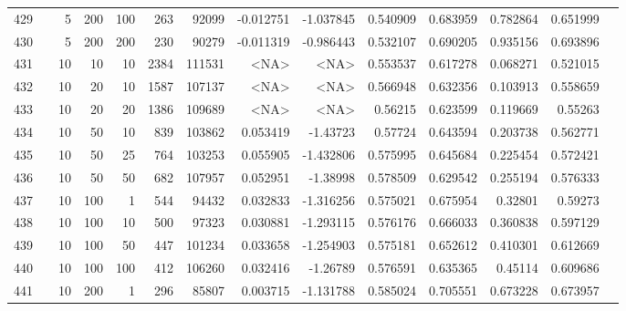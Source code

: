 \begin{longtable}{llrrrrrrrrrrrr}
		429 & &            5 &               200 &          100 &          263 &      92099 & -0.012751 & -1.037845 &  0.540909 &    0.683959 &       0.782864 &  0.651999 \\
		430 & &            5 &               200 &          200 &          230 &      90279 & -0.011319 & -0.986443 &  0.532107 &    0.690205 &       0.935156 &  0.693896 \\
		431 & &           10 &                10 &           10 &           2384 &     111531 &      <NA> &      <NA> &  0.553537 &    0.617278 &       0.068271 &  0.521015 \\
		432 & &           10 &                20 &           10 &           1587 &     107137 &      <NA> &      <NA> &  0.566948 &    0.632356 &       0.103913 &  0.558659 \\
		433 & &           10 &                20 &           20 &           1386 &     109689 &      <NA> &      <NA> &   0.56215 &    0.623599 &       0.119669 &   0.55263 \\
		434 & &           10 &                50 &           10 &         839 &     103862 &  0.053419 &  -1.43723 &   0.57724 &    0.643594 &       0.203738 &  0.562771 \\
		435 & &           10 &                50 &           25 &          764 &     103253 &  0.055905 & -1.432806 &  0.575995 &    0.645684 &       0.225454 &  0.572421 \\
		436 & &           10 &                50 &           50 &          682 &     107957 &  0.052951 &  -1.38998 &  0.578509 &    0.629542 &       0.255194 &  0.576333 \\
		437 & &           10 &               100 &            1 &          544 &      94432 &  0.032833 & -1.316256 &  0.575021 &    0.675954 &        0.32801 &   0.59273 \\
		438 & &           10 &               100 &           10 &          500 &      97323 &  0.030881 & -1.293115 &  0.576176 &    0.666033 &       0.360838 &  0.597129 \\
		439 & &           10 &               100 &           50 &          447 &     101234 &  0.033658 & -1.254903 &  0.575181 &    0.652612 &       0.410301 &  0.612669 \\
		440 & &           10 &               100 &          100 &          412 &     106260 &  0.032416 &  -1.26789 &  0.576591 &    0.635365 &        0.45114 &  0.609686 \\
		441 & &           10 &               200 &            1 &          296 &      85807 &  0.003715 & -1.131788 &  0.585024 &    0.705551 &       0.673228 &  0.673957 \\

\end{longtable}
